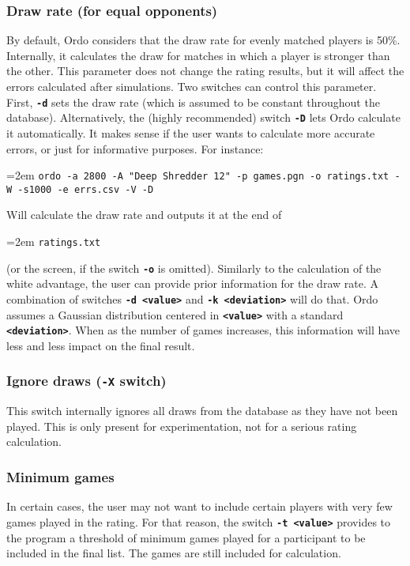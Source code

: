\documentclass[12pt]{article}
\newcommand{\swtch} [1] {\texttt{\textbf{#1}}}
\newcommand{\cmdln}[1]{
	\par
	\begingroup
		\leftskip=2em
		\addtolength{\rightskip}{0em}
		\noindent \small{\texttt{#1}}
		\par
	\endgroup
}
\begin{document}
\subsubsection*{Draw rate (for equal opponents)}
By default, Ordo considers that the draw rate for evenly matched players is 50\%.
Internally, it calculates the draw for matches in which a player is stronger than the other.
This parameter does not change the rating results, but it will affect the errors calculated after simulations.
Two switches can control this parameter. 
First, \swtch{-d} sets the draw rate (which is assumed to be constant throughout the database). 
Alternatively, the (highly recommended) switch \swtch{-D} lets Ordo calculate it automatically. 
It makes sense if the user wants to calculate more accurate errors, or just for informative purposes.
For instance:

\cmdln{ordo -a 2800 -A "Deep Shredder 12" -p games.pgn -o ratings.txt -W -s1000 -e errs.csv -V -D}

Will calculate the draw rate and outputs it at the end of \cmdln{ratings.txt} (or the screen, if the switch \swtch{-o} is omitted). 
Similarly to the calculation of the white advantage, the user can provide prior information for the draw rate.
A combination of switches \swtch{-d <value>} and \swtch{-k <deviation>} will do that.
Ordo assumes a Gaussian distribution centered in \swtch{<value>} with a standard \swtch{<deviation>}.
When as the number of games increases, this information will have less and less impact on the final result.

\subsubsection*{Ignore draws (\swtch{-X} switch)}

This switch internally ignores all draws from the database as they have not been played.
This is only present for experimentation, not for a serious rating calculation.

\subsubsection*{Minimum games}

In certain cases, the user may not want to include certain players with very few games played in the rating. 
For that reason, the switch \swtch{-t <value>} provides to the program a threshold of minimum games played for a participant to be included in the final list.
The games are still included for calculation.
\end{document}
